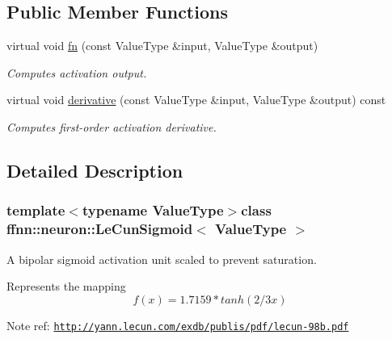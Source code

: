 \subsection*{Public Member Functions}
\begin{DoxyCompactItemize}
\item 
virtual void \hyperlink{classffnn_1_1neuron_1_1_le_cun_sigmoid_abac0c8e08b1289c288923fd8e6f12ce2}{fn} (const Value\-Type \&input, Value\-Type \&output)
\begin{DoxyCompactList}\small\item\em Computes activation output. \end{DoxyCompactList}\item 
virtual void \hyperlink{classffnn_1_1neuron_1_1_le_cun_sigmoid_a4802deb108ab8ca6a67a4d7d55124fb2}{derivative} (const Value\-Type \&input, Value\-Type \&output) const 
\begin{DoxyCompactList}\small\item\em Computes first-\/order activation derivative. \end{DoxyCompactList}\end{DoxyCompactItemize}


\subsection{Detailed Description}
\subsubsection*{template$<$typename Value\-Type$>$class ffnn\-::neuron\-::\-Le\-Cun\-Sigmoid$<$ Value\-Type $>$}

A bipolar sigmoid activation unit scaled to prevent saturation. 

Represents the mapping \[ f(x) = 1.7159 * tanh(2/3 x) \]

\begin{DoxyNote}{Note}
ref\-: \href{http://yann.lecun.com/exdb/publis/pdf/lecun-98b.pdf}{\tt http\-://yann.\-lecun.\-com/exdb/publis/pdf/lecun-\/98b.\-pdf} 
\end{DoxyNote}


